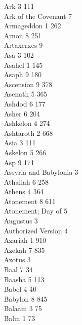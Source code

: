 Ark \hfill 3 \quad \phantom{0}111\\
Ark of the Covenant \hfill 7 \\
Armageddon \hfill 1 \quad \phantom{0}262\\
Arnon \hfill 8 \quad \phantom{0}251\\
Artaxerxes \hfill 9 \\
Asa \hfill 3 \quad \phantom{0}102\\
Asahel \hfill 1 \quad \phantom{0}145\\
Asaph \hfill 9 \quad \phantom{0}180\\
Ascension \hfill 9 \quad \phantom{0}378\\
Asenath \hfill 5 \quad \phantom{0}365\\
Ashdod \hfill 6 \quad \phantom{0}177\\
Asher \hfill 6 \quad \phantom{0}204\\
Ashkelon \hfill 4 \quad \phantom{0}274\\
Ashtaroth \hfill 2 \quad \phantom{0}668\\
Asia \hfill 3 \quad \phantom{0}111\\
Askelon \hfill 5 \quad \phantom{0}266\\
Asp \hfill 9 \quad \phantom{0}171\\
Assyria and Babylonia \hfill 3 \\
Athaliah \hfill 6 \quad \phantom{0}258\\
Athens \hfill 4 \quad \phantom{0}364\\
Atonement \hfill 8 \quad \phantom{0}611\\
Atonement; Day of \hfill 5 \\
Augustus \hfill 3 \\
Authorized Version \hfill 4 \\
Azariah \hfill 1 \quad \phantom{0}910\\
Azekah \hfill 7 \quad \phantom{0}835\\
Azotus \hfill 3 \\
Baal \hfill 7 \quad \phantom{0}\phantom{0}34\\
Baasha \hfill 5 \quad \phantom{0}113\\
Babel \hfill 4 \quad \phantom{0}\phantom{0}40\\
Babylon \hfill 8 \quad \phantom{0}845\\
Balaam \hfill 3 \quad \phantom{0}\phantom{0}75\\
Balm \hfill 1 \quad \phantom{0}\phantom{0}73\\
